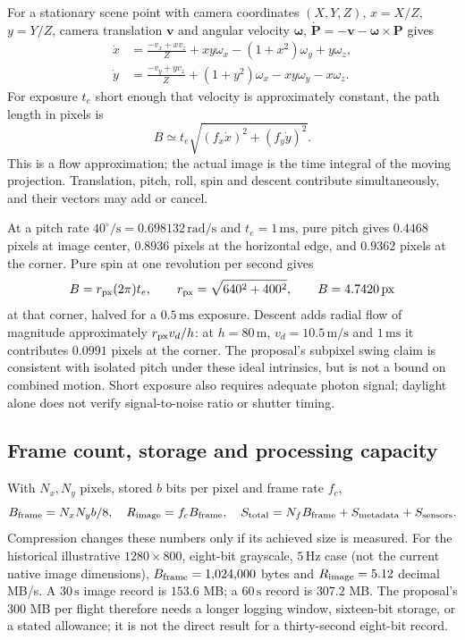\documentclass[11pt,a4paper]{article}
\numberwithin{equation}{section}
\begin{document}
For a stationary scene point with camera coordinates $(X,Y,Z)$,
$x=X/Z$, $y=Y/Z$, camera translation $\boldsymbol v$ and angular velocity
$\boldsymbol\omega$, $\dot{\boldsymbol P}=-\boldsymbol v-
\boldsymbol\omega\times\boldsymbol P$ gives
\begin{align}
 \dot x&=\frac{-v_x+xv_z}{Z}+xy\omega_x-(1+x^2)\omega_y+y\omega_z,\\
 \dot y&=\frac{-v_y+yv_z}{Z}+(1+y^2)\omega_x-xy\omega_y-x\omega_z.
\end{align}
For exposure $t_e$ short enough that velocity is approximately constant,
the path length in pixels is
\begin{equation}
 B\simeq t_e\sqrt{(f_x\dot x)^2+(f_y\dot y)^2}.
\end{equation}
This is a flow approximation; the actual image is the time integral of the
moving projection. Translation, pitch, roll, spin and descent contribute
simultaneously, and their vectors may add or cancel.

At a pitch rate $40^\circ/\mathrm s=0.698132\,\mathrm{rad/s}$ and
$t_e=1\,\mathrm{ms}$, pure pitch gives $0.4468$ pixels at image center,
$0.8936$ pixels at the horizontal edge, and $0.9362$ pixels at the corner.
Pure spin at one revolution per second gives
\begin{equation}
 B=r_{\rm px}(2\pi)t_e,
 \qquad r_{\rm px}=\sqrt{640^2+400^2},\qquad B=4.7420\,\mathrm{px}
\end{equation}
at that corner, halved for a $0.5\,\mathrm{ms}$ exposure.
Descent adds radial flow of magnitude approximately
$r_{\rm px}v_d/h$: at $h=80\,\mathrm m$, $v_d=10.5\,\mathrm{m/s}$
and $1\,\mathrm{ms}$ it contributes $0.0991$ pixels at the corner.
The proposal's subpixel swing claim is consistent with isolated pitch
under these ideal intrinsics, but is not a bound on combined motion.
Short exposure also requires adequate photon signal; daylight alone does
not verify signal-to-noise ratio or shutter timing.

\subsection{Frame count, storage and processing capacity}

With $N_x,N_y$ pixels, stored $b$ bits per pixel and frame rate $f_c$,
\begin{equation}
 B_{\rm frame}=N_xN_yb/8,
 \quad R_{\rm image}=f_cB_{\rm frame},
 \quad S_{\rm total}=N_fB_{\rm frame}+S_{\rm metadata}+S_{\rm sensors}.
\end{equation}
Compression changes these numbers only if its achieved size is measured.
For the historical illustrative $1280\times800$, eight-bit grayscale,
$5\,\mathrm{Hz}$ case (not the current native image dimensions),
$B_{\rm frame}=1{,}024{,}000$ bytes and $R_{\rm image}=5.12$ decimal
MB/s. A $30\,\mathrm s$ image record is $153.6$ MB; a $60\,\mathrm s$
record is $307.2$ MB. The proposal's $300$ MB per flight therefore
needs a longer logging window, sixteen-bit storage, or a stated allowance;
it is not the direct result for a thirty-second eight-bit record.
\end{document}
